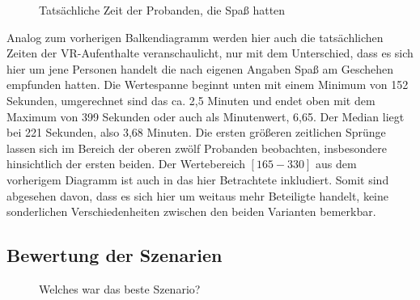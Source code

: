 \documentclass{Paper}
\begin{document}
		\begin{figure}[H]
  \caption{Tatsächliche Zeit der Probanden, die Spaß hatten}
  \label{ZeitSpass}
	\end{figure}
	Analog zum vorherigen Balkendiagramm werden hier auch die tatsächlichen Zeiten der VR-Aufenthalte veranschaulicht, nur mit dem Unterschied, dass es sich hier um jene Personen handelt die nach eigenen Angaben Spaß am Geschehen empfunden hatten.
Die Wertespanne beginnt unten mit einem Minimum von 152 Sekunden, umgerechnet sind das ca. 2,5 Minuten und endet oben mit dem Maximum von 399 Sekunden oder auch als Minutenwert, 6,65. Der Median liegt bei 221 Sekunden, also 3,68 Minuten. Die ersten größeren zeitlichen Sprünge lassen sich im Bereich der oberen zwölf Probanden beobachten, insbesondere hinsichtlich der ersten beiden. Der Wertebereich $[165-330]$ aus dem vorherigem Diagramm ist auch in das hier Betrachtete inkludiert. Somit sind abgesehen davon, dass es sich hier um weitaus mehr Beteiligte handelt, keine sonderlichen Verschiedenheiten zwischen den beiden Varianten bemerkbar.
	
\newpage

\subsection{Bewertung der Szenarien}
	\begin{figure}[ht]
\caption{Welches war das beste Szenario?}
\label{SzenarioGut}
\end{figure}
\end{document}
